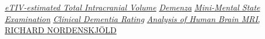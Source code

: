 \documentclass[10pt, a4paper,openany]{article}
\begin{document}
\begin{multicols}{2}
\tableofcontents






\begin{thebibliography}{1}
	\href{https://surfer.nmr.mgh.harvard.edu/fswiki/eTIV}{\emph{eTIV-estimated Total Intracranial Volume}}
	\href{https://it.wikipedia.org/wiki/Demenza}{\emph{Demenza}}
	\href{https://it.wikipedia.org/wiki/Mini-Mental_State_Examination}{\emph{Mini-Mental State Examination}}
	\href{https://it.wikipedia.org/wiki/Clinical_Dementia_Rating}{\emph{Clinical Dementia Rating}}
	\href{https://pdfs.semanticscholar.org/f078/58e6d1c1463367e1157f2c127b1d1a4652fd.pdf}{\emph{Analysis of Human Brain MRI}, RICHARD NORDENSKJÖLD}
\end{thebibliography}

\end{multicols}
\end{document}
